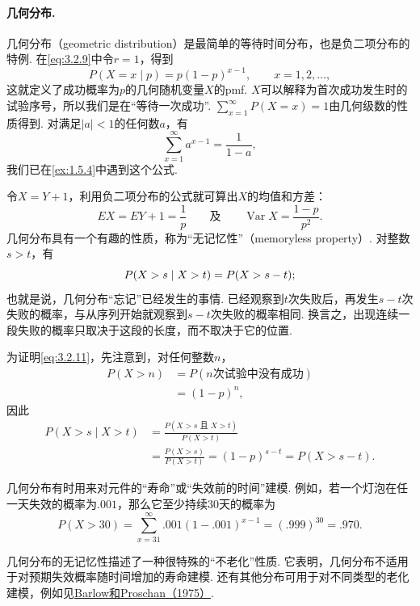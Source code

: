 \paragraph{几何分布.}
几何分布（geometric distribution）是最简单的等待时间分布，也是负二项分布的特例. 在\eqref{eq:3.2.9}中令$r=1$，得到
$$P(X=x\mid p)=p(1-p)^{x-1},\qquad x=1,2,\ldots,$$
这就定义了成功概率为$p$的几何随机变量$X$的pmf. $X$可以解释为首次成功发生时的试验序号，所以我们是在“等待一次成功”. $\sum_{x=1}^\infty P(X=x)=1$由几何级数的性质得到. 对满足$|a|<1$的任何数$a$，有
$$\sum_{x=1}^\infty a^{x-1}=\frac1{1-a},$$
我们已在\autoref{ex:1.5.4}中遇到这个公式.

令$X=Y+1$，利用负二项分布的公式就可算出$X$的均值和方差：
$$EX=EY+1=\frac1p\qquad\text{及}\qquad\operatorname{Var}X=\frac{1-p}{p^2}.$$
几何分布具有一个有趣的性质，称为“无记忆性”（memoryless property）. 对整数$s>t$，有
\begin{equation}\label{eq:3.2.11}\index{SI0320@无记忆性}
P(X>s\mid X>t)=P(X>s-t);
\end{equation}
也就是说，几何分布“忘记”已经发生的事情. 已经观察到$t$次失败后，再发生$s-t$次失败的概率，与从序列开始就观察到$s-t$次失败的概率相同. 换言之，出现连续一段失败的概率只取决于这段的长度，而不取决于它的位置.

为证明\eqref{eq:3.2.11}，先注意到，对任何整数$n$，
\begin{equation}\label{eq:3.2.12}
\begin{aligned}
P(X>n)&=P(n\text{次试验中没有成功})\\
&=(1-p)^n,
\end{aligned}
\end{equation}
因此
\begin{align*}
P(X>s\mid X>t)&=\frac{P(X>s\text{ 且 }X>t)}{P(X>t)}\\
&=\frac{P(X>s)}{P(X>t)}=(1-p)^{s-t}=P(X>s-t).
\end{align*}
\begin{example}[失效时间]\label{ex:3.2.7}
几何分布有时用来对元件的“寿命”或“失效前的时间”建模. 例如，若一个灯泡在任一天失效的概率为$.001$，那么它至少持续30天的概率为
$$P(X>30)=\sum_{x=31}^\infty .001(1-.001)^{x-1}=(.999)^{30}=.970.$$
\end{example}
几何分布的无记忆性描述了一种很特殊的“不老化”性质. 它表明，几何分布不适用于对预期失效概率随时间增加的寿命建模. 还有其他分布可用于对不同类型的老化建模，例如见\hyperref[bib:source9]{Barlow和Proschan（1975）}.
